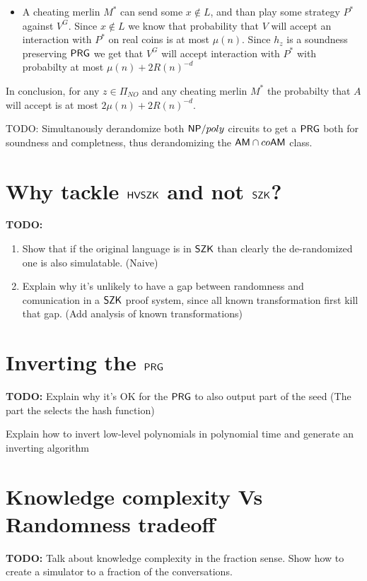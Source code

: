 \documentclass[11]{article}
\newenvironment{proof}[1][Proof]{\begin{trivlist}
\item[\hskip \labelsep {\bfseries #1}]}{\end{trivlist}}
\begin{document}
\begin{proof}
\begin{itemize}
	\item A cheating merlin $M^*$ can send some $x \notin L$, and than play some strategy $P^*$ against $V^G$. Since $x \notin L$ we know that probability that $V$ will accept an interaction with $P^*$ on real coins is at most $\mu(n)$. Since $h_z$ is a soundness preserving $\mathsf{PRG}$ we get that $V^G$ will accept interaction with $P^*$ with probabilty at most $\mu(n) + 2R(n)^{-d}$
\end{itemize}

In conclusion, for any $z \in \Pi_{NO}$ and any cheating merlin $M^*$ the probabilty that $A$ will accept is at most $2\mu(n) + 2R(n)^{-d}$.

\begin{theorem}


TODO: Simultanously derandomize both $\mathsf{NP} / poly$ circuits to get a $\mathsf{PRG}$ both for soundness and completness, thus derandomizing the $\mathsf{AM} \cap co\mathsf{AM}$ class.

\end{theorem}

\end{proof}

\section{Why tackle $\mathsf{HVSZK}$ and not $\mathsf{SZK}$?}
\textbf{TODO:}
\begin{enumerate}
	\item Show that if the original language is in $\mathsf{SZK}$ than clearly the de-randomized one is also simulatable. (Naive)
	\item Explain why it's unlikely to have a gap between randomness and comunication in a $\mathsf{SZK}$ proof system, since all known transformation first kill that gap. (Add analysis of known transformations)

	
\end{enumerate}


\section{Inverting the $\mathsf{PRG}$}
\textbf{TODO:}
Explain why it's OK for the $\mathsf{PRG}$ to also output part of the seed (The part the selects the hash function)

Explain how to invert low-level polynomials in polynomial time and generate an inverting algorithm


\section{Knowledge complexity Vs Randomness tradeoff}
\textbf{TODO:}
Talk about knowledge complexity in the fraction sense. Show how to create a simulator to a fraction of the conversations.
\end{document}
